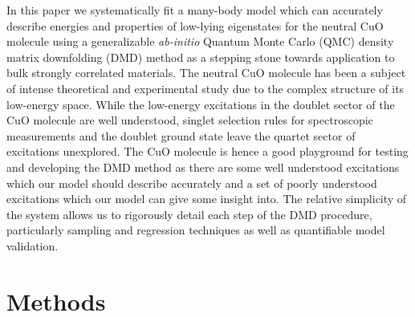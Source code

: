 \documentclass{article}
\begin{document}
In this paper we systematically fit a many-body model
which can accurately describe energies and properties of low-lying eigenstates for the neutral CuO molecule using a generalizable \textit{ab-initio} Quantum Monte Carlo (QMC) density matrix downfolding (DMD) method as a stepping stone towards application to bulk strongly correlated materials.
The neutral CuO molecule has been a subject of intense theoretical and experimental study due to the complex structure of its low-energy space.
While the low-energy excitations in the doublet sector of the CuO molecule are well understood, singlet selection rules for spectroscopic measurements and the doublet ground state leave the quartet sector of excitations unexplored.
The CuO molecule is hence a good playground for testing and developing the DMD method as there are some well understood excitations which our model should describe accurately and a set of poorly understood excitations which our model can give some insight into.
The relative simplicity of the system allows us to rigorously detail each step of the DMD procedure, particularly sampling and regression techniques as well as quantifiable model validation.

\section{Methods}
\end{document}
